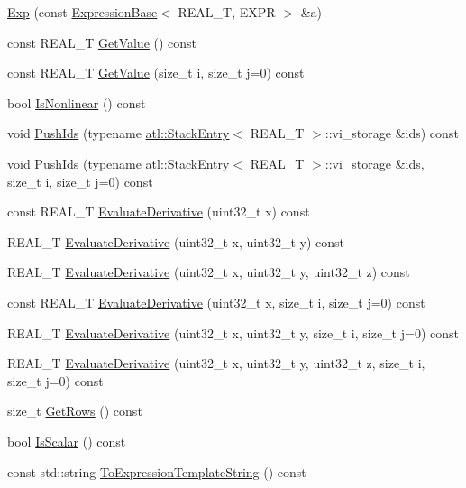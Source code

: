 \begin{DoxyCompactItemize}
\item 
\hyperlink{structatl_1_1_exp_a4fc8871d953fd609370164f42929d736}{Exp} (const \hyperlink{structatl_1_1_expression_base}{Expression\+Base}$<$ R\+E\+A\+L\+\_\+\+T, E\+X\+P\+R $>$ \&a)
\item 
const R\+E\+A\+L\+\_\+\+T \hyperlink{structatl_1_1_exp_a4ad5a9a1666163b6e66ecf4865b30e7e}{Get\+Value} () const 
\item 
const R\+E\+A\+L\+\_\+\+T \hyperlink{structatl_1_1_exp_afbc8958aa71585d44bc767a6b2f62e4f}{Get\+Value} (size\+\_\+t i, size\+\_\+t j=0) const 
\item 
bool \hyperlink{structatl_1_1_exp_a6f7e2607ed8f8e8efe2b5502a2af1650}{Is\+Nonlinear} () const 
\item 
void \hyperlink{structatl_1_1_exp_ac4029416d216ad718ffbb6365f0748f4}{Push\+Ids} (typename \hyperlink{structatl_1_1_stack_entry}{atl\+::\+Stack\+Entry}$<$ R\+E\+A\+L\+\_\+\+T $>$\+::vi\+\_\+storage \&ids) const 
\item 
void \hyperlink{structatl_1_1_exp_a76212b4f0346075224dada55da989326}{Push\+Ids} (typename \hyperlink{structatl_1_1_stack_entry}{atl\+::\+Stack\+Entry}$<$ R\+E\+A\+L\+\_\+\+T $>$\+::vi\+\_\+storage \&ids, size\+\_\+t i, size\+\_\+t j=0) const 
\item 
const R\+E\+A\+L\+\_\+\+T \hyperlink{structatl_1_1_exp_a6e3b08bdc5b3c8ea2cdc0006248edb76}{Evaluate\+Derivative} (uint32\+\_\+t x) const 
\item 
R\+E\+A\+L\+\_\+\+T \hyperlink{structatl_1_1_exp_ae5128016b472aba06bce35bd13369378}{Evaluate\+Derivative} (uint32\+\_\+t x, uint32\+\_\+t y) const 
\item 
R\+E\+A\+L\+\_\+\+T \hyperlink{structatl_1_1_exp_ad672b4534d729dbaa1a9a7dd22329289}{Evaluate\+Derivative} (uint32\+\_\+t x, uint32\+\_\+t y, uint32\+\_\+t z) const 
\item 
const R\+E\+A\+L\+\_\+\+T \hyperlink{structatl_1_1_exp_aa379bdfbffb0c50ce02ab47278d74d3a}{Evaluate\+Derivative} (uint32\+\_\+t x, size\+\_\+t i, size\+\_\+t j=0) const 
\item 
R\+E\+A\+L\+\_\+\+T \hyperlink{structatl_1_1_exp_af80900837e7a13290ac46ef82a555c48}{Evaluate\+Derivative} (uint32\+\_\+t x, uint32\+\_\+t y, size\+\_\+t i, size\+\_\+t j=0) const 
\item 
R\+E\+A\+L\+\_\+\+T \hyperlink{structatl_1_1_exp_a58146b72d96dcf551be5a4996911cf7f}{Evaluate\+Derivative} (uint32\+\_\+t x, uint32\+\_\+t y, uint32\+\_\+t z, size\+\_\+t i, size\+\_\+t j=0) const 
\item 
size\+\_\+t \hyperlink{structatl_1_1_exp_a38e06c08362ce93a59211e45447d75de}{Get\+Rows} () const 
\item 
bool \hyperlink{structatl_1_1_exp_a6b808d05166e359e2adbc4528ff16e25}{Is\+Scalar} () const 
\item 
const std\+::string \hyperlink{structatl_1_1_exp_a07351fca2ccffee1c4c9ae2853991433}{To\+Expression\+Template\+String} () const 
\end{DoxyCompactItemize}
